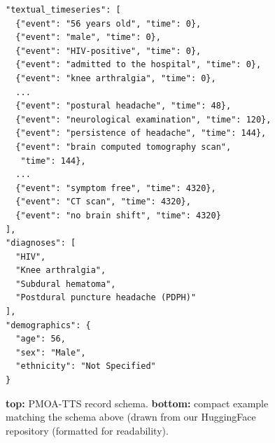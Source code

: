 \begin{figure}[htbp]
\begin{ChFiveFloatBody}
\begin{minipage}[t]{\linewidth}
\begin{tcolorbox}[
  colback=gray!5,
  colframe=gray!70,
  title=Example JSON entry,
  boxrule=1pt,
  enhanced,
  fontupper=\footnotesize
]
\begin{verbatim}
"textual_timeseries": [
  {"event": "56 years old", "time": 0},
  {"event": "male", "time": 0},
  {"event": "HIV-positive", "time": 0},
  {"event": "admitted to the hospital", "time": 0},
  {"event": "knee arthralgia", "time": 0},
  ...
  {"event": "postural headache", "time": 48},
  {"event": "neurological examination", "time": 120},
  {"event": "persistence of headache", "time": 144},
  {"event": "brain computed tomography scan",
   "time": 144},
  ...
  {"event": "symptom free", "time": 4320},
  {"event": "CT scan", "time": 4320},
  {"event": "no brain shift", "time": 4320}
],
"diagnoses": [
  "HIV",
  "Knee arthralgia",
  "Subdural hematoma",
  "Postdural puncture headache (PDPH)"
],
"demographics": {
  "age": 56,
  "sex": "Male",
  "ethnicity": "Not Specified"
}
\end{verbatim}
\end{tcolorbox}
\end{minipage}





\end{ChFiveFloatBody}
\caption{\textbf{top:} PMOA-TTS record schema. \textbf{bottom:} compact example matching the schema above (drawn from our HuggingFace repository (formatted for readability).}
\end{figure}